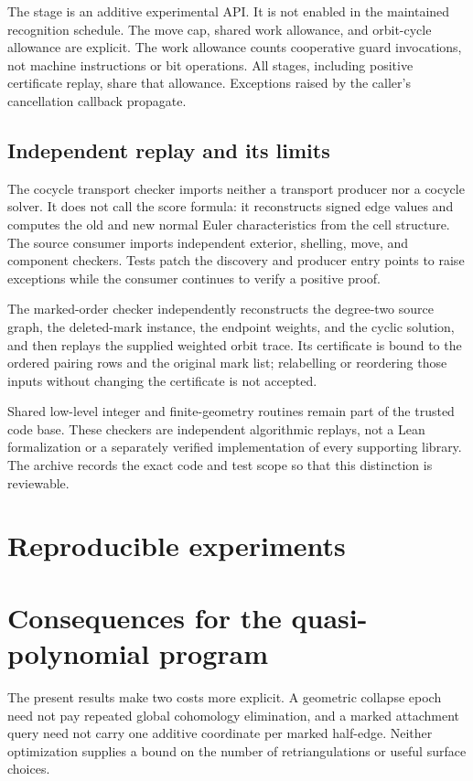 \documentclass[11pt,letterpaper]{article}
\theoremstyle{definition}
\theoremstyle{remark}
\begin{document}
The stage is an additive experimental API. It is not enabled in the
maintained recognition schedule. The move cap, shared work allowance, and
orbit-cycle allowance are explicit. The work allowance counts cooperative
guard invocations, not machine instructions or bit operations. All stages,
including positive certificate replay, share that allowance. Exceptions
raised by the caller's cancellation callback propagate.

\subsection{Independent replay and its limits}

The cocycle transport checker imports neither a transport producer nor a
cocycle solver. It does not call the score formula: it reconstructs signed
edge values and computes the old and new normal Euler characteristics from
the cell structure. The source consumer imports independent exterior,
shelling, move, and component checkers. Tests patch the discovery and
producer entry points to raise exceptions while the consumer continues to
verify a positive proof.

The marked-order checker independently reconstructs the degree-two source
graph, the deleted-mark instance, the endpoint weights, and the cyclic
solution, and then replays the supplied weighted orbit trace. Its certificate
is bound to the ordered pairing rows and the original mark list; relabelling
or reordering those inputs without changing the certificate is not accepted.

Shared low-level integer and finite-geometry routines remain part of the
trusted code base. These checkers are independent algorithmic replays,
not a Lean formalization or a separately verified implementation of every
supporting library. The archive records the exact code and test scope so
that this distinction is reviewable.

\section{Reproducible experiments}
\label{sec:experiments}


\section{Consequences for the quasi-polynomial program}
\label{sec:program}

The present results make two costs more explicit. A geometric collapse
epoch need not pay repeated global cohomology elimination, and a marked
attachment query need not carry one additive coordinate per marked
half-edge. Neither optimization supplies a bound on the number of
retriangulations or useful surface choices.
\end{document}
